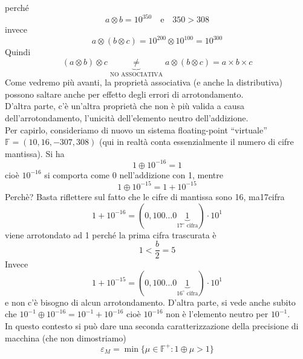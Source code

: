 \documentclass[12pt]{article}
\begin{document}
perché  \[a \otimes b = 10^{350} \quad \text{e} \quad 350 >308\]
invece \[ a \otimes (b \otimes c) = 10^{200} \otimes 10^{100} = 10^{300} \]
Quindi \[ (a \otimes b) \otimes c \underbrace{\ne}_{\text{NO ASSOCIATIVA}} a \otimes (b \otimes c) = a \times b \times c \]
\newline \newline
Come vedremo più avanti, la proprietà associativa (e anche la distributiva) possono saltare anche per effetto degli errori di arrotondamento.\\
D’altra parte, c’è un’altra proprietà che non è più valida a causa dell’arrotondamento, l’unicità dell'elemento neutro dell'addizione.\\
Per capirlo, consideriamo di nuovo un sistema floating-point “virtuale” $\mathbb{F} = (10, 16, -307, 308)$ (qui in realtà conta essenzialmente il numero di cifre mantissa). Si ha 
\[ 1 \oplus 10^{-16} = 1\]
cioè $10^{-16}$ si comporta come 0 nell'addizione con 1, mentre 
\[ 1 \oplus 10^{-15} = 1 + 10^{-15}\]
Perchè? Basta riflettere sul fatto che le cifre di mantissa sono 16, ma17cifra
\[ 1 + 10^{-16} = (0,100 \dotsc 0 \underbrace{1}_{17^\circ\text{ cifra}}) \cdot 10^1\]
viene arrotondato ad 1 perché la prima cifra trascurata è \[ 1 < \frac{b}{2} = 5 \]
Invece \[ 1 + 10^{-15} = (0,100 \dotsc 0 \underbrace{1}_{16^\circ\text{ cifra}}) \cdot 10^1\] 
e non c’è bisogno di alcun arrotondamento.
D’altra parte, si vede anche subito che $ 10^{-1} \oplus 10^{-16} = 10^{-1} + 10^{-16} $ cioè $10^{-16}$ non è l’elemento neutro per $10^{-1}$.\\
In questo contesto si può dare una seconda caratterizzazione della precisione di macchina (che non dimostriamo)
\[ \varepsilon_M = \min \{\mu \in \mathbb{F}^+ : 1 \oplus \mu > 1\} \]
\end{document}
